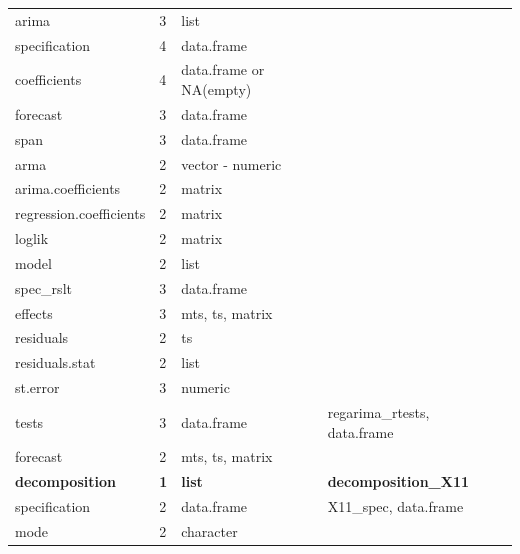 \documentclass[article]{jss}
\begin{document}
\begin{longtable}[t]{lllll}
\addlinespace
\hspace{3em}arima & 3 & list &  & \\
\hspace{4em}specification & 4 & data.frame &  & \\
\hspace{4em}coefficients & 4 & data.frame or NA(empty) &  & \\
\hspace{3em}forecast & 3 & data.frame &  & \\
\hspace{3em}span & 3 & data.frame &  & \\
\addlinespace
\hspace{2em}arma & 2 & vector - numeric &  & \\
\hspace{2em}arima.coefficients & 2 & matrix &  & \\
\hspace{2em}regression.coefficients & 2 & matrix &  & \\
\hspace{2em}loglik & 2 & matrix &  & \\
\hspace{2em}model & 2 & list &  \vphantom{1} & \\
\addlinespace
\hspace{3em}spec\_rslt & 3 & data.frame &  & \\
\hspace{3em}effects & 3 & mts, ts, matrix &  & \\
\hspace{2em}residuals & 2 & ts &  & \\
\hspace{2em}residuals.stat & 2 & list &  & \\
\hspace{3em}st.error & 3 & numeric &  & \\
\addlinespace
\hspace{3em}tests & 3 & data.frame & regarima\_rtests, data.frame & \\
\hspace{2em}forecast & 2 & mts, ts, matrix &  & \\
\textbf{\hspace{1em}decomposition} & \textbf{1} & \textbf{list} & \textbf{decomposition\_X11}\\
\hspace{2em}specification & 2 & data.frame & X11\_spec, data.frame & \\
\hspace{2em}mode & 2 & character &  \vphantom{1} & \\

\end{longtable}
\end{document}
